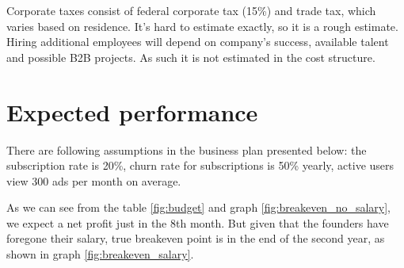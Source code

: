 Corporate taxes consist of federal corporate tax (15\%) and trade tax, which varies based on residence. It's hard to estimate exactly, so it is a rough estimate.
Hiring additional employees will depend on company's success, available talent and possible B2B projects.
As such it is not estimated in the cost structure.

\section{Expected performance}

There are following assumptions in the business plan presented below: the subscription rate is 20\%, churn rate for subscriptions is 50\% yearly, active users view 300 ads per month on average.

\p
As we can see from the table \ref{fig:budget} and graph \ref{fig:breakeven_no_salary}, we expect a net profit just in the 8th month. But given that the founders have foregone their salary, true breakeven point is in the end of the second year, as shown in graph \ref{fig:breakeven_salary}.

